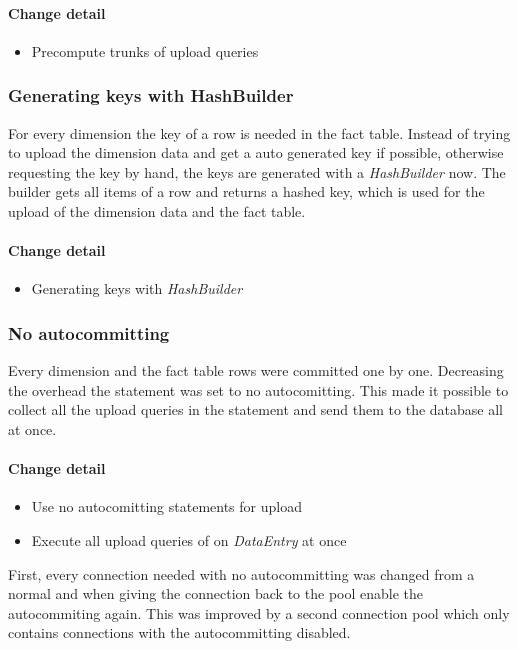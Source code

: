 \paragraph{Change detail}
\begin{itemize}
  \item Precompute trunks of upload queries
\end{itemize}


\subsubsection{Generating keys with HashBuilder}
For every dimension the key of a row is needed in the fact table.
Instead of trying to upload the dimension data and get a auto generated key if possible,
otherwise requesting the key by hand, the keys are generated with a
\textit{HashBuilder} now. The builder gets all items of a row and
returns a hashed key, which is used for the upload of the dimension data
and the fact table.

\paragraph{Change detail}
\begin{itemize}
  \item Generating keys with \textit{HashBuilder}
\end{itemize}


\subsubsection{No autocommitting}
Every dimension and the fact table rows were committed one by one. Decreasing
the overhead the statement was set to no autocomitting. This made it possible
to collect all the upload queries in the statement and send them to the database
all at once.

\paragraph{Change detail} 
\begin{itemize}
  \item Use no autocomitting statements for upload
  \item Execute all upload queries of on \textit{DataEntry} at once
\end{itemize}

First, every connection needed with no autocommitting was changed from a normal
and when giving the connection back to the pool enable the autocommiting again.
This was improved by a second connection pool which only contains
connections with the autocommitting disabled.


